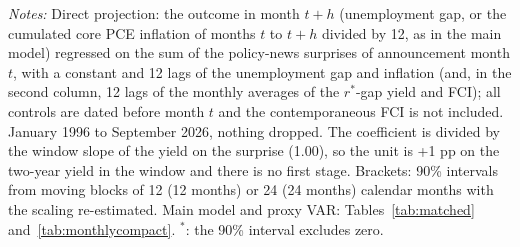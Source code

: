 \begin{table}[tp]\centering\footnotesize\setlength{\tabcolsep}{3pt}
\caption{A Direct Projection on the Policy Surprise}\label{tab:direct}
\begin{flushleft}\footnotesize\textit{Notes:} Direct projection: the outcome in month $t+h$ (unemployment gap, or the cumulated core PCE inflation of months $t$ to $t+h$ divided by 12, as in the main model) regressed on the sum of the policy-news surprises of announcement month $t$, with a constant and 12 lags of the unemployment gap and inflation (and, in the second column, 12 lags of the monthly averages of the $r^*$-gap yield and FCI); all controls are dated before month $t$ and the contemporaneous FCI is not included. January 1996 to September 2026, nothing dropped. The coefficient is divided by the window slope of the yield on the surprise (1.00), so the unit is +1 pp on the two-year yield in the window and there is no first stage. Brackets: 90\% intervals from moving blocks of 12 (12 months) or 24 (24 months) calendar months with the scaling re-estimated. Main model and proxy VAR: Tables~\ref{tab:matched} and~\ref{tab:monthlycompact}. $^{*}$: the 90\% interval excludes zero.\end{flushleft}
\end{table}
